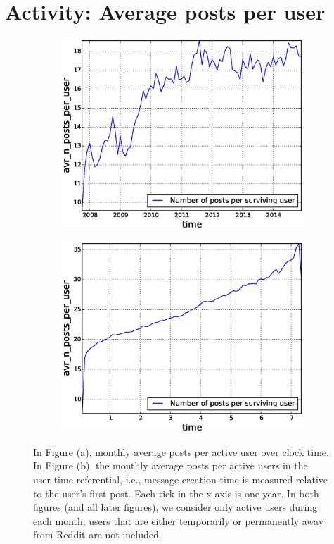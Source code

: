 \section{Activity: Average posts per user}

\begin{figure}[!tb]
\centering
\begin{subfigure}{.49\textwidth}\includegraphics[scale=0.4]{./images/avr_posts_per_user_over_time_total.eps}\caption{}\end{subfigure}
\begin{subfigure}{.49\textwidth}\includegraphics[scale=0.4]{./images/avr_posts_per_user_user_ref_total.eps}\caption{}\end{subfigure}
\caption{In Figure (a), monthly average posts per active user over clock time. In Figure (b), the monthly average posts per active users in the user-time referential, i.e., message creation time is measured relative to the user's first post.  Each tick in the x-axis is one year.  In both figures (and all later figures), we consider only active users during each month; users that are either temporarily or permanently away from Reddit are not included.}
\label{fig:overall_posts}
\end{figure}
